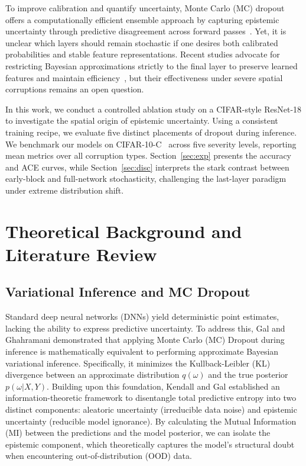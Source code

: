 \documentclass[10pt,twocolumn,letterpaper]{article}
\begin{document}
To improve calibration and quantify uncertainty, Monte Carlo (MC) dropout~\cite{gal2016dropout} offers a computationally efficient ensemble approach by capturing epistemic uncertainty through predictive disagreement across forward passes~\cite{kendall2017what}. Yet, it is unclear which layers should remain stochastic if one desires both calibrated probabilities and stable feature representations. Recent studies advocate for restricting Bayesian approximations strictly to the final layer to preserve learned features and maintain efficiency~\cite{daxberger2021laplace,kristiadi2020being}, but their effectiveness under severe spatial corruptions remains an open question.

In this work, we conduct a controlled ablation study on a CIFAR-style ResNet-18 to investigate the spatial origin of epistemic uncertainty. Using a consistent training recipe, we evaluate five distinct placements of dropout during inference. We benchmark our models on CIFAR-10-C~\cite{hendrycks2019benchmarking} across five severity levels, reporting mean metrics over all corruption types. Section~\ref{sec:exp} presents the accuracy and ACE curves, while Section~\ref{sec:disc} interprets the stark contrast between early-block and full-network stochasticity, challenging the last-layer paradigm under extreme distribution shift.

\section{Theoretical Background and Literature Review}

\subsection{Variational Inference and MC Dropout}
Standard deep neural networks (DNNs) yield deterministic point estimates, lacking the ability to express predictive uncertainty. To address this, Gal and Ghahramani \cite{gal2016dropout} demonstrated that applying Monte Carlo (MC) Dropout during inference is mathematically equivalent to performing approximate Bayesian variational inference. Specifically, it minimizes the Kullback-Leibler (KL) divergence between an approximate distribution $q(\omega)$ and the true posterior $p(\omega | X, Y)$. Building upon this foundation, Kendall and Gal \cite{kendall2017what} established an information-theoretic framework to disentangle total predictive entropy into two distinct components: aleatoric uncertainty (irreducible data noise) and epistemic uncertainty (reducible model ignorance). By calculating the Mutual Information (MI) between the predictions and the model posterior, we can isolate the epistemic component, which theoretically captures the model's structural doubt when encountering out-of-distribution (OOD) data.
\end{document}

